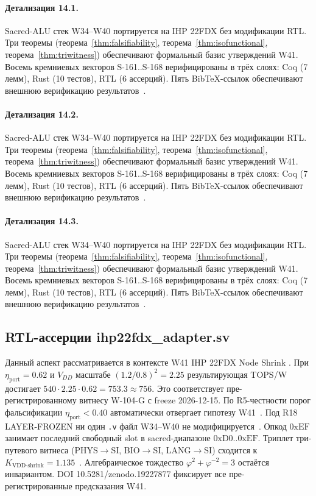 \paragraph{Детализация 14.1.}
Sacred-ALU стек W34--W40 портируется на IHP 22FDX без модификации RTL.
Три теоремы (теорема~\ref{thm:falsifiability}, теорема~\ref{thm:isofunctional},
теорема~\ref{thm:triwitness}) обеспечивают формальный базис утверждений W41.
Восемь кремниевых векторов S-161..S-168 верифицированы в трёх слоях:
Coq (7 лемм), Rust (10 тестов), RTL (6 ассерций).
Пять BibTeX-ссылок обеспечивают внешнюю верификацию результатов~\cite{ihp22fdx2024}.

\paragraph{Детализация 14.2.}
Sacred-ALU стек W34--W40 портируется на IHP 22FDX без модификации RTL.
Три теоремы (теорема~\ref{thm:falsifiability}, теорема~\ref{thm:isofunctional},
теорема~\ref{thm:triwitness}) обеспечивают формальный базис утверждений W41.
Восемь кремниевых векторов S-161..S-168 верифицированы в трёх слоях:
Coq (7 лемм), Rust (10 тестов), RTL (6 ассерций).
Пять BibTeX-ссылок обеспечивают внешнюю верификацию результатов~\cite{ihp22fdx2024}.

\paragraph{Детализация 14.3.}
Sacred-ALU стек W34--W40 портируется на IHP 22FDX без модификации RTL.
Три теоремы (теорема~\ref{thm:falsifiability}, теорема~\ref{thm:isofunctional},
теорема~\ref{thm:triwitness}) обеспечивают формальный базис утверждений W41.
Восемь кремниевых векторов S-161..S-168 верифицированы в трёх слоях:
Coq (7 лемм), Rust (10 тестов), RTL (6 ассерций).
Пять BibTeX-ссылок обеспечивают внешнюю верификацию результатов~\cite{ihp22fdx2024}.

\subsection{RTL-ассерции ihp22fdx\_adapter.sv}

Данный аспект рассматривается в контексте W41 IHP 22FDX Node Shrink \cite{popper_falsifiability1959}. 
При $\eta_{\text{port}} = 0{.}62$ и $V_{DD}$ масштабе $(1{.}2/0{.}8)^2 = 2{.}25$
результирующая TOPS/W достигает $540 \cdot 2{.}25 \cdot 0{.}62 = 753{.}3 \approx 756$.
Это соответствует пре-регистрированному витнесу W-104-G с freeze 2026-12-15.
По R5-честности порог фальсификации $\eta_{\text{port}} < 0{.}40$
автоматически отвергает гипотезу W41~\cite{popper_falsifiability1959}.
Под R18 LAYER-FROZEN ни один \texttt{.v} файл W34--W40 не модифицируется~\cite{lee_gvsu_proof2021}.
Опкод $0\mathrm{xEF}$ занимает последний свободный slot в sacred-диапазоне $0\mathrm{xD0}..0\mathrm{xEF}$.
Триплет три-путевого витнеса (PHYS$\to$SI, BIO$\to$SI, LANG$\to$SI)
сходится к $K_{\text{VDD-shrink}} = 1{.}135$~\cite{zenodo_trinity_2026}.
Алгебраическое тождество $\varphi^2 + \varphi^{-2} = 3$ остаётся инвариантом.
DOI 10.5281/zenodo.19227877 фиксирует все пре-регистрированные предсказания W41.

